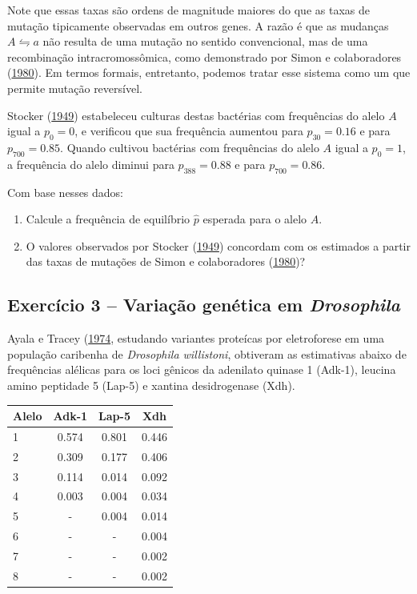 \documentclass[
]{book}
\begin{document}
Note que essas taxas são ordens de magnitude maiores do que as taxas de mutação tipicamente observadas em outros genes. A razão é que as mudanças \(A \leftrightharpoons a\) não resulta de uma mutação no sentido convencional, mas de uma recombinação intracromossômica, como demonstrado por Simon e colaboradores (\href{https://doi.org/10.1126/science.6251543}{1980}). Em termos formais, entretanto, podemos tratar esse sistema como um que permite mutação reversível.

Stocker (\href{https://doi.org/10.1017/s002217240001473x}{1949}) estabeleceu culturas destas bactérias com frequências do alelo \(A\) igual a \(p_0 = 0\), e verificou que sua frequência aumentou para \(p_{30} = 0.16\) e para \(p_{700} = 0.85\). Quando cultivou bactérias com frequências do alelo \(A\) igual a \(p_0 = 1\), a frequência do alelo diminui para \(p_{388} = 0.88\) e para \(p_{700} = 0.86\).

Com base nesses dados:

\begin{enumerate}
\def\labelenumi{\alph{enumi}.}
\item
  Calcule a frequência de equilíbrio \(\hat{p}\) esperada para o alelo \(A\).
\item
  O valores observados por Stocker (\href{https://doi.org/10.1017/s002217240001473x}{1949}) concordam com os estimados a partir das taxas de mutações de Simon e colaboradores (\href{https://doi.org/10.1126/science.6251543}{1980})?
\end{enumerate}

\hypertarget{exercuxedcio-3-variauxe7uxe3o-genuxe9tica-em-drosophila}{%
\subsection{\texorpdfstring{Exercício 3 -- Variação genética em \emph{Drosophila}}{Exercício 3 -- Variação genética em Drosophila}}\label{exercuxedcio-3-variauxe7uxe3o-genuxe9tica-em-drosophila}}

Ayala e Tracey (\href{https://doi.org/10.1073/pnas.71.3.999}{1974}, estudando variantes proteícas por eletroforese em uma população caribenha de \emph{Drosophila willistoni}, obtiveram as estimativas abaixo de frequências alélicas para os loci gênicos da adenilato quinase 1 (Adk-1), leucina amino peptidade 5 (Lap-5) e xantina desidrogenase (Xdh).

\begin{longtable}[]{@{}lccc@{}}
\toprule()
Alelo & Adk-1 & Lap-5 & Xdh \\
\midrule()
\endhead
1 & 0.574 & 0.801 & 0.446 \\
2 & 0.309 & 0.177 & 0.406 \\
3 & 0.114 & 0.014 & 0.092 \\
4 & 0.003 & 0.004 & 0.034 \\
5 & - & 0.004 & 0.014 \\
6 & - & - & 0.004 \\
7 & - & - & 0.002 \\
8 & - & - & 0.002 \\
\bottomrule()
\end{longtable}
\end{document}
